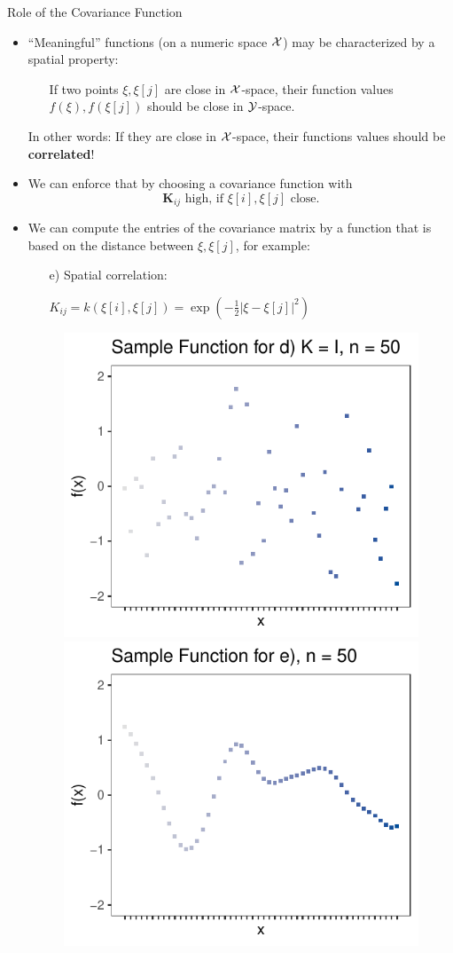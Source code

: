 \documentclass[11pt,compress,t,notes=noshow, xcolor=table]{beamer}
\begin{document}
\begin{vbframe}{Role of the Covariance Function}
\begin{itemize}
  \item \enquote{Meaningful} functions (on a numeric space $\mathcal{X}$) may be characterized by a spatial property: \vspace*{0.2cm}
  \begin{itemize}
    \item[] If two points $\xi, \xi[j]$ are close in $\mathcal{X}$-space, their function values $f(\xi), f(\xi[j])$ should be close in $\mathcal{Y}$-space.
  \end{itemize} \vspace*{0.2cm}
  In other words: If they are close in $\mathcal{X}$-space, their functions values should be \textbf{correlated}! \vspace*{0.4cm}
  \item We can enforce that by choosing a covariance function with
  $$
    \bm{K}_{ij} \text{ high, if } \xi[i], \xi[j] \text{ close.}
  $$

  \framebreak

  \item We can compute the entries of the covariance matrix by a function that is based on the distance between $\xi, \xi[j]$, for example:

  \vspace*{0.2cm}
  \begin{enumerate}
    \item[e)] Spatial correlation: \begin{footnotesize}$K_{ij} = k(\xi[i], \xi[j]) = \exp\left(-\frac{1}{2}\left|\xi - \xi[j]\right|^2\right)$\end{footnotesize}
  \end{enumerate}

\begin{figure}
  \includegraphics[width=0.45\linewidth]{figure/discrete/example_extreme_50_5.pdf}  \includegraphics[width=0.45\linewidth]{figure/discrete/example_extreme_50_6.pdf}
\end{figure}


\end{itemize}
\end{vbframe}
\end{document}
